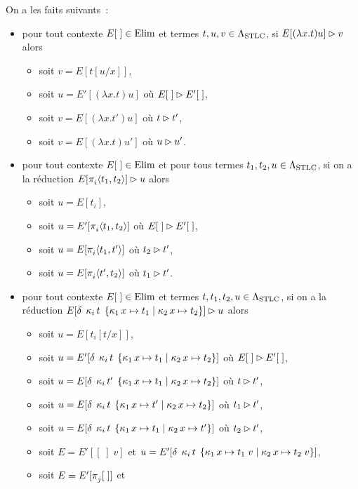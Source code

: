 \begin{theorem}
  On a les faits suivants~:
  \begin{itemize}
  \item pour tout contexte $E[\;]\in\mathrm{Elim}$ et termes $t,u,v \in \Lambda_{\mathrm{STLC}}$, si
    $E[(\lambda x.t)u] \rhd v$ alors
    \begin{itemize}
    \item soit $v = E[t[u/x]]$,
    \item soit $u = E'[(\lambda x.t)u]$ où $E[\;]\rhd E'[\;]$,
    \item soit $v = E[(\lambda x.t')u]$ où $t \rhd t'$,
    \item soit $v = E[(\lambda x.t)u']$ où $u\rhd u'$.
    \end{itemize}
  \item pour tout contexte $E[\;]\in\mathrm{Elim}$ et pour tous termes
    $t_1,t_2,u \in \Lambda_{\mathrm{STLC}}$, si on a la réduction
    $E[\mathop{\pi_{i}^{}}\langle t_1,t_2\rangle] \rhd u$ alors
    \begin{itemize}
    \item soit $u = E[t_i]$,
    \item soit
      $u = E'[\mathop{\pi_{i}^{}}\langle t_1,t_2\rangle]$ où $E[\;]\rhd E'[\;]$,
    \item soit $u = E[\mathop{\pi_{i}^{}}\langle t_1,t'\rangle]$ où $t_2 \rhd t'$,
    \item soit $u = E[\mathop{\pi_{i}^{}}\langle t',t_2\rangle]$ où $t_1 \rhd t'$.
    \end{itemize}
  \item pour tout contexte $E[\;]\in\mathrm{Elim}$ et termes $t,t_1,t_2,u \in \Lambda_{\mathrm{STLC}}$,
    si on a la réduction $E[\delta\;\mathop{\kappa_{i}}t\;\left\{\mathop{\kappa_{1}} x\mapsto t_1 \;\middle\vert\; \mathop{\kappa_{2}} x\mapsto t_2\right\}] \rhd u$
    alors
    \begin{itemize}
    \item soit $u = E[t_i[t/x]]$,
    \item soit $u = E'[\delta\;\mathop{\kappa_{i}}t\;\left\{\mathop{\kappa_{1}} x\mapsto t_1 \;\middle\vert\; \mathop{\kappa_{2}} x\mapsto t_2\right\}]$ où
      $E[\;]\rhd E'[\;]$,
    \item soit $u = E[\delta\;\mathop{\kappa_{i}}t'\;\left\{\mathop{\kappa_{1}} x\mapsto t_1 \;\middle\vert\; \mathop{\kappa_{2}} x\mapsto t_2\right\}]$ où
      $t \rhd t'$,
    \item soit $u = E[\delta\;\mathop{\kappa_{i}}t\;\left\{\mathop{\kappa_{1}} x\mapsto t' \;\middle\vert\; \mathop{\kappa_{2}} x\mapsto t_2\right\}]$ où
      $t_1 \rhd t'$,
    \item soit $u = E[\delta\;\mathop{\kappa_{i}}t\;\left\{\mathop{\kappa_{1}} x\mapsto t_1 \;\middle\vert\; \mathop{\kappa_{2}} x\mapsto t'\right\}]$ où
      $t_2 \rhd t'$,
    \item soit $E = E'[[\;]\;v]$ et
      $u = E'[\delta\;\mathop{\kappa_{i}}t\;\left\{\mathop{\kappa_{1}} x\mapsto t_1\;v \;\middle\vert\; \mathop{\kappa_{2}} x\mapsto t_2\;v\right\}]$,
    \item soit $E = E'[\mathop{\pi_{j}^{}}[\;]]$ et

\end{itemize}
\end{itemize}
\end{theorem}
